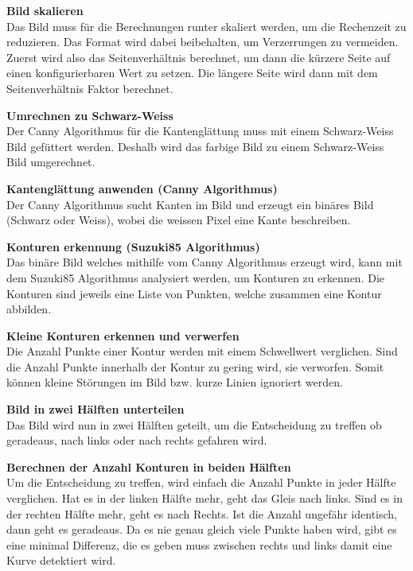 \documentclass[../../main.tex]{subfiles}
\begin{document}
\textbf{Bild skalieren}\\
Das Bild muss für die Berechnungen runter skaliert werden, um die Rechenzeit zu reduzieren. Das Format
wird dabei beibehalten, um Verzerrungen zu vermeiden. Zuerst wird also das Seitenverhältnis berechnet, um dann
die kürzere Seite auf einen konfigurierbaren Wert zu setzen. Die längere Seite wird dann mit dem Seitenverhältnis Faktor
berechnet.

\textbf{Umrechnen zu Schwarz-Weiss}\\
Der Canny Algorithmus für die Kantenglättung muss mit einem Schwarz-Weiss Bild gefüttert werden. Deshalb wird das farbige Bild
zu einem Schwarz-Weiss Bild umgerechnet.

\textbf{Kantenglättung anwenden (Canny Algorithmus)}\\
Der Canny Algorithmus sucht Kanten im Bild und erzeugt ein binäres Bild (Schwarz oder Weiss), wobei die weissen Pixel eine Kante
beschreiben.

\textbf{Konturen erkennung (Suzuki85 Algorithmus)}\\
Das binäre Bild welches mithilfe vom Canny Algorithmus erzeugt wird, kann mit dem Suzuki85 Algorithmus analysiert werden, um Konturen zu erkennen.
Die Konturen sind jeweils eine Liste von Punkten, welche zusammen eine Kontur abbilden.

\textbf{Kleine Konturen erkennen und verwerfen}\\
Die Anzahl Punkte einer Kontur werden mit einem Schwellwert verglichen. Sind die Anzahl Punkte innerhalb der Kontur zu gering wird, sie verworfen.
Somit können kleine Störungen im Bild bzw. kurze Linien ignoriert werden.

\textbf{Bild in zwei Hälften unterteilen}\\
Das Bild wird nun in zwei Hälften geteilt, um die Entscheidung zu treffen ob geradeaus, nach links oder nach rechts gefahren wird.

\textbf{Berechnen der Anzahl Konturen in beiden Hälften}\\
Um die Entscheidung zu treffen, wird einfach die Anzahl Punkte in jeder Hälfte verglichen. Hat es in der linken Hälfte mehr, geht das Gleis nach links.
Sind es in der rechten Hälfte mehr, geht es nach Rechts. Ist die Anzahl ungefähr identisch, dann geht es geradeaus. Da es nie genau gleich viele Punkte haben wird,
gibt es eine minimal Differenz, die es geben muss zwischen rechts und links damit eine Kurve detektiert wird.
\end{document}
